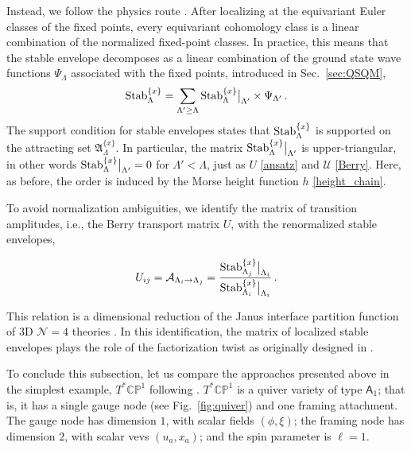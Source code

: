 \documentclass[10pt]{article}
\theoremstyle{definition}
\def\CA{{\cal A}}
\def\fA{\mathfrak{A}}
\def\sU{{\mathscr{U}}}
\def\lm{\limits}
\numberwithin{equation}{section}
\begin{document}
Instead, we follow the physics route \cite{Dedushenko:2021mds,Bullimore:2021rnr}.
After localizing at the equivariant Euler classes of the fixed points, every equivariant cohomology class is a linear combination of the normalized fixed-point classes.
In practice, this means that the stable envelope decomposes as a linear combination of the ground state wave functions $\Psi_{\Lambda}$ associated with the fixed points, introduced in Sec.~\ref{sec:QSQM},
\begin{equation}
	{\rm Stab}_{\Lambda}^{\{x\}}=\sum\lm_{\Lambda'\geq \Lambda} {\rm Stab}_{\Lambda}^{\{x\}}\big|_{\Lambda'}\times \Psi_{\Lambda'}\,.
\end{equation}
The support condition for stable envelopes states that ${\rm Stab}_{\Lambda}^{\{x\}}$ is supported on the attracting set $\fA_{\Lambda}^{\{x\}}$.
In particular, the matrix ${\rm Stab}_{\Lambda}^{\{x\}}\big|_{\Lambda'}$ is upper-triangular, in other words ${\rm Stab}_{\Lambda}^{\{x\}}\big|_{\Lambda'}=0$ for $\Lambda'<\Lambda$, just as $U$ \eqref{ansatz} and $\sU$ \eqref{Berry}.
Here, as before, the order is induced by the Morse height function $h$ \eqref{height_chain}.

To avoid normalization ambiguities, we identify the matrix of transition amplitudes, i.e., the Berry transport matrix $U$, with the renormalized stable envelopes,
\begin{tcolorbox}
	\begin{equation}
		U_{ij}=\CA_{\Lambda_i\to\Lambda_j}=\frac{{\rm Stab}_{\Lambda_j}^{\{x\}}\big|_{\Lambda_i}}{{\rm Stab}_{\Lambda_i}^{\{x\}}\big|_{\Lambda_i}}\,.
	\end{equation}
\end{tcolorbox}
\noindent This relation is a dimensional reduction of the Janus interface partition function of 3D $\mathcal{N}=4$ theories \cite{Dedushenko:2021mds,Bullimore:2021rnr}.
In this identification, the matrix of localized stable envelopes plays the role of the factorization twist as originally designed in \cite{MO}.

To conclude this subsection, let us compare the approaches presented above in the simplest example, $T^*\mathbb{CP}^1$ following \cite{MO,Bullimore:2017lwu}.
$T^*\mathbb{CP}^1$ is a quiver variety of type $\mathsf{A}_1$; that is, it has a single gauge node (see Fig.~\ref{fig:quiver}) and one framing attachment.
The gauge node has dimension $1$, with scalar fields $(\phi,\xi)$; the framing node has dimension $2$, with scalar vevs $(u_a,x_a)$; and the spin parameter is $\ell=1$.
\end{document}
